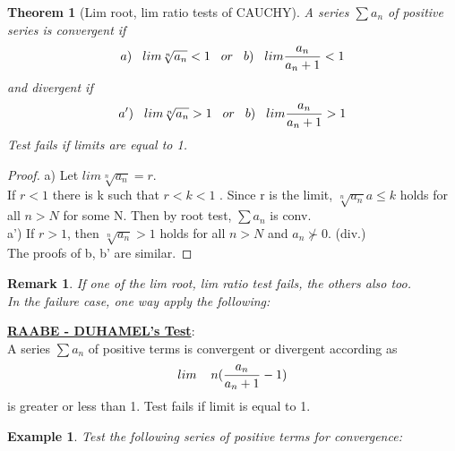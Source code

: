 \documentclass[11pt]{amsbook}
\newtheorem{theorem}{Theorem}
\newtheorem*{remark}{Remark}
\newtheorem{example}{Example}
\begin{document}
\begin{theorem} [Lim root, lim ratio tests of CAUCHY] 
A series  $\sum {a_n} $  of positive series is convergent if 
\begin{equation}
a)\hspace{3mm}  lim \sqrt[n]{a_n} <  1  \hspace{3mm} or  \hspace{3mm}   b)\hspace{3mm} lim \frac{a_n}{a_n+1} < 1 
\end{equation}
and divergent if
\begin{equation}
a')\hspace{3mm} lim \sqrt[n]{a_n} >  1   \hspace{3mm}  or \hspace{3mm}  b)\hspace{3mm}  lim \frac{a_n}{a_n+1} > 1 
\end{equation}
Test fails if limits are equal to 1.
\end{theorem}

\begin{proof} 
a) Let $lim \sqrt[n]{a_n} = r$. \\
If $r < 1$ there is k such that $r <  k  < 1$ . Since r is the limit, $\sqrt[n]{a_n} a \leq k$ holds for all $n  > N$ for some N. Then by root test, $\sum {a_n} $ is conv. \\
a') If $r > 1$, then $\sqrt[n]{a_n} > 1$ holds for all $n > N$ and ${a_n} \nsucc  0$. (div.) \\
The proofs of b, b'  are similar.
\end{proof}

\begin{remark}
If one of the lim root, lim ratio test fails, the others also too. \\
In the failure case, one way apply the following:
\end{remark}
\textbf{\underline{RAABE - DUHAMEL's Test}}: \\
A series $\sum {a_n} $ of positive terms is convergent or divergent according as \\
\begin{equation}
lim \hspace{4mm} n(\frac{a_n}{a_n+1}-1) 
\end{equation}
is greater or less than 1. Test fails if limit is equal to 1. 
\begin{example}
Test the following series of positive terms for convergence:
\end{example}
\end{document}
